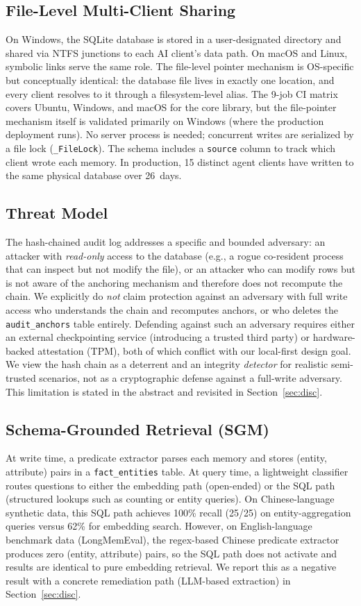 ﻿\documentclass{article}
\begin{document}
\subsection{File-Level Multi-Client Sharing}
On Windows, the SQLite database is stored in a user-designated directory and shared via NTFS junctions to each AI client's data path. On macOS and Linux, symbolic links serve the same role. The file-level pointer mechanism is OS-specific but conceptually identical: the database file lives in exactly one location, and every client resolves to it through a filesystem-level alias. The 9-job CI matrix covers Ubuntu, Windows, and macOS for the core library, but the file-pointer mechanism itself is validated primarily on Windows (where the production deployment runs). No server process is needed; concurrent writes are serialized by a file lock (\texttt{\_FileLock}). The schema includes a \texttt{source} column to track which client wrote each memory. In production, 15 distinct agent clients have written to the same physical database over 26~days.

\subsection{Threat Model}
\label{sec:threat}
The hash-chained audit log addresses a specific and bounded adversary: an attacker with \emph{read-only} access to the database (e.g., a rogue co-resident process that can inspect but not modify the file), or an attacker who can modify rows but is not aware of the anchoring mechanism and therefore does not recompute the chain. We explicitly do \emph{not} claim protection against an adversary with full write access who understands the chain and recomputes anchors, or who deletes the \texttt{audit\_anchors} table entirely. Defending against such an adversary requires either an external checkpointing service (introducing a trusted third party) or hardware-backed attestation (TPM), both of which conflict with our local-first design goal. We view the hash chain as a deterrent and an integrity \emph{detector} for realistic semi-trusted scenarios, not as a cryptographic defense against a full-write adversary. This limitation is stated in the abstract and revisited in Section~\ref{sec:disc}.

\subsection{Schema-Grounded Retrieval (SGM)}
At write time, a predicate extractor parses each memory and stores (entity, attribute) pairs in a \texttt{fact\_entities} table. At query time, a lightweight classifier routes questions to either the embedding path (open-ended) or the SQL path (structured lookups such as counting or entity queries). On Chinese-language synthetic data, this SQL path achieves 100\% recall (25/25) on entity-aggregation queries versus 62\% for embedding search. However, on English-language benchmark data (LongMemEval), the regex-based Chinese predicate extractor produces zero (entity, attribute) pairs, so the SQL path does not activate and results are identical to pure embedding retrieval. We report this as a negative result with a concrete remediation path (LLM-based extraction) in Section~\ref{sec:disc}.
\end{document}
